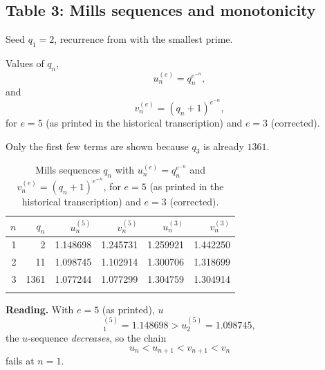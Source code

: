 \documentclass[11pt,reqno]{amsart}
\makeatletter
\theoremstyle{redplain}
\renewenvironment{quotation}{\list{}{\listparindent\z@\itemindent\z@\rightmargin\leftmargin\parsep\z@}\item\relax}{\endlist}
\numberwithin{equation}{section}
\makeatother
\begin{document}
\subsection{Table 3: Mills sequences and monotonicity}

\begin{quotation}
\noindent%
Seed $q_{1}=2$, recurrence from  with the smallest
prime.

\noindent
Values of $q_{n}$,%
\begin{equation}
u_{n}^{(e)}=q_{n}^{e^{-n}},
\end{equation}%
and 
\begin{equation*}
v_{n}^{(e)}=(q_{n}+1)^{e^{-n}},
\end{equation*}
\noindent%
for $e=5$ (as printed in the historical transcription) and $e=3$ (corrected).

\noindent%
Only the first few terms are shown because $q_{3}$ is already $1361$.
\end{quotation}

\begin{table}[]
\centering
\begin{tabular}{rrrrrr}
\toprule $n$ & $q_n$ & $u_n^{(5)}$ & $v_n^{(5)}$ & $u_n^{(3)}$ & $v_n^{(3)}$
\\ 
\midrule 1 & 2 & 1.148698 & 1.245731 & 1.259921 & 1.442250 \\ 
2 & 11 & 1.098745 & 1.102914 & 1.300706 & 1.318699 \\ 
3 & 1361 & 1.077244 & 1.077299 & 1.304759 & 1.304914 \\ 
\bottomrule &  &  &  &  & 
\end{tabular}%
\caption{Mills sequences $q_n$ with $u_n^{(e)}=q_n^{e^{-n}}$ and $%
v_n^{(e)}=(q_n+1)^{e^{-n}}$, for $e=5$ (as printed in the historical
transcription) and $e=3$ (corrected).}
\label{tab:mills-mono}
\end{table}

\textbf{Reading.} With $e=5$ (as printed), $u$%
\begin{equation}
_{1}^{(5)}=1.148698>u_{2}^{(5)}=1.098745,
\end{equation}%
the $u$-sequence \emph{decreases}, so the chain 
\begin{equation}
u_{n}<u_{n+1}<v_{n+1}<v_{n}
\end{equation}%
fails at $n=1$.
\end{document}
